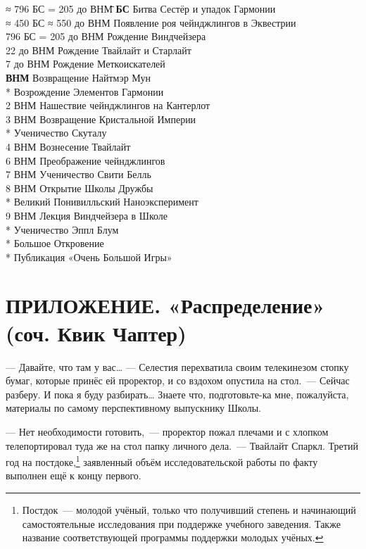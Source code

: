 \documentclass[fontsize=11pt,a5paper,titlepage=firstcover]{scrbook}
\begin{document}
\begin{tabbing}
	≈ 796 БС = 205 до ВНМ\hspace{1em}\=\kill
	\textbf{БС} \> Битва Сестёр и упадок Гармонии\\[\ado]
	≈ 450 БС ≈ 550 до ВНМ \> Появление роя чейнджлингов в Эквестрии\\[\ado]
	796 БС = 205 до ВНМ \> Рождение Виндчейзера\\[\ado]
	22 до ВНМ \> Рождение Твайлайт и Старлайт\\[\ado]
	7 до ВНМ \> Рождение Меткоискателей\\[\ado]
	\textbf{ВНМ} \> Возвращение Найтмэр Мун\\*
	  \> Возрождение Элементов Гармонии\\[\ado]
	2 ВНМ \> Нашествие чейнджлингов на Кантерлот\\[\ado]
	3 ВНМ \> Возвращение Кристальной Империи\\*
	       \> Ученичество Скуталу\\[\ado]
	4 ВНМ \> Вознесение Твайлайт\\[\ado]
	6 ВНМ \> Преображение чейнджлингов\\[\ado]
	7 ВНМ \> Ученичество Свити Белль\\[\ado]
	8 ВНМ \> Открытие Школы Дружбы\\*
	      \> Великий Понивилльский Наноэксперимент\\[\ado]
	9 ВНМ \> Лекция Виндчейзера в Школе\\*
	      \> Ученичество Эппл Блум\\*
	      \> Большое Откровение\\*
	      \> Публикация «Очень Большой Игры»
\end{tabbing} 


\chapter*{ПРИЛОЖЕНИЕ. «Распределение» (соч. Квик Чаптер)}\label{raspredelenie}

--- Давайте, что там у вас{\ldots} --- Селестия перехватила своим телекинезом стопку бумаг, которые принёс ей проректор, и со вздохом опустила на стол.~--- Сейчас разберу. И пока я буду разбирать{\ldots} Знаете что, подготовьте-ка мне, пожалуйста, материалы по самому перспективному выпускнику Школы.

--- Нет необходимости готовить,~--- проректор пожал плечами и с хлопком телепортировал туда же на стол папку личного дела.~--- Твайлайт Спаркл. Третий год на постдоке,\footnote{Постдок --- молодой учёный, только что получивший степень и начинающий самостоятельные исследования при поддержке учебного заведения. Также название соответствующей программы поддержки молодых учёных.} заявленный объём исследовательской работы по факту выполнен ещё к концу первого.
\end{document}
